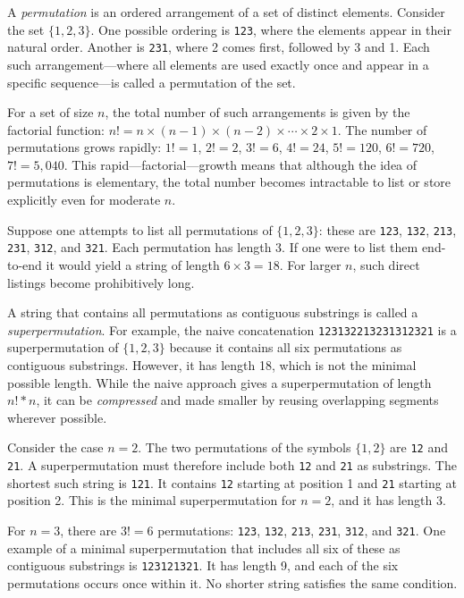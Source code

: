 A \emph{permutation} is an ordered arrangement of a set of distinct elements. Consider the set $\{1, 2, 3\}$. One possible ordering is \texttt{123}, where the elements appear in their natural order. Another is \texttt{231}, where 2 comes first, followed by 3 and 1. Each such arrangement—where all elements are used exactly once and appear in a specific sequence—is called a permutation of the set.

For a set of size $n$, the total number of such arrangements is given by the factorial function: $n! = n \times (n-1) \times (n-2) \times \cdots \times 2 \times 1$. The number of permutations grows rapidly: $1! = 1$, $2! = 2$, $3! = 6$, $4! = 24$, $5! = 120$, $6! = 720$, $7! = 5{,}040$. This rapid—factorial—growth means that although the idea of permutations is elementary, the total number becomes intractable to list or store explicitly even for moderate $n$.

Suppose one attempts to list all permutations of $\{1, 2, 3\}$: these are \texttt{123}, \texttt{132}, \texttt{213}, \texttt{231}, \texttt{312}, and \texttt{321}. Each permutation has length 3. If one were to list them end-to-end it would yield a string of length $6 \times 3 = 18$. For larger $n$, such direct listings become prohibitively long.

A string that contains all permutations as contiguous substrings is called a \emph{superpermutation}. For example, the naive concatenation \texttt{123132213231312321} is a superpermutation of $\{1, 2, 3\}$ because it contains all six permutations as contiguous substrings. However, it has length 18, which is not the minimal possible length. While the naive approach gives a superpermutation of length $n!*n$, it can be \emph{compressed} and made smaller by reusing overlapping segments wherever possible.

Consider the case $n = 2$. The two permutations of the symbols $\{1, 2\}$ are \texttt{12} and \texttt{21}. A superpermutation must therefore include both \texttt{12} and \texttt{21} as substrings. The shortest such string is \texttt{121}. It contains \texttt{12} starting at position 1 and \texttt{21} starting at position 2. This is the minimal superpermutation for $n = 2$, and it has length 3.

For $n = 3$, there are $3! = 6$ permutations: \texttt{123}, \texttt{132}, \texttt{213}, \texttt{231}, \texttt{312}, and \texttt{321}. One example of a minimal superpermutation that includes all six of these as contiguous substrings is \texttt{123121321}. It has length 9, and each of the six permutations occurs once within it. No shorter string satisfies the same condition.

